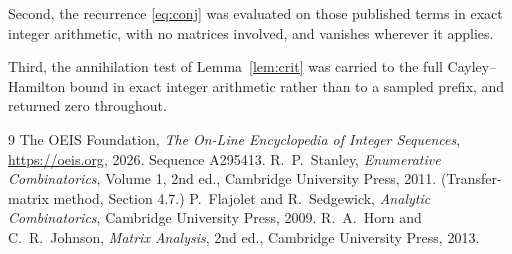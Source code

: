 \documentclass[11pt,a4paper]{article}
\theoremstyle{plain}
\theoremstyle{definition}
\begin{document}
Second, the recurrence \eqref{eq:conj} was evaluated on those published terms in exact
integer arithmetic, with no matrices involved, and vanishes wherever it applies.

Third, the annihilation test of Lemma~\ref{lem:crit} was carried to the full
Cayley--Hamilton bound in exact integer arithmetic rather than to a sampled prefix, and
returned zero throughout.

\begin{thebibliography}{9}
 The OEIS Foundation, \emph{The On-Line Encyclopedia of Integer
Sequences}, \url{https://oeis.org}, 2026. Sequence A295413.
 R.~P.~Stanley, \emph{Enumerative Combinatorics}, Volume 1, 2nd ed.,
Cambridge University Press, 2011. (Transfer-matrix method, Section 4.7.)
 P.~Flajolet and R.~Sedgewick, \emph{Analytic Combinatorics}, Cambridge
University Press, 2009.
 R.~A.~Horn and C.~R.~Johnson, \emph{Matrix Analysis}, 2nd ed., Cambridge
University Press, 2013.
\end{thebibliography}
\end{document}
